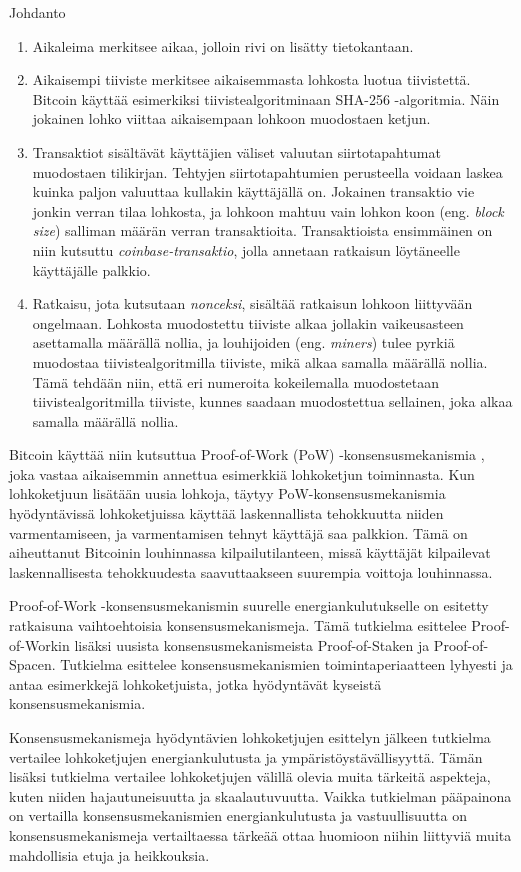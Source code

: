 \begin{chapter}{Johdanto\label{intro}}
\begin{otherlanguage}{finnish}
\begin{enumerate}
\item Aikaleima merkitsee aikaa, jolloin rivi on lisätty tietokantaan.
\item Aikaisempi tiiviste merkitsee aikaisemmasta lohkosta luotua tiivistettä. Bitcoin käyttää esimerkiksi tiivistealgoritminaan SHA-256 -algoritmia. Näin jokainen lohko viittaa aikaisempaan lohkoon muodostaen ketjun.
\item Transaktiot sisältävät käyttäjien väliset valuutan siirtotapahtumat muodostaen tilikirjan. Tehtyjen siirtotapahtumien perusteella voidaan laskea kuinka paljon valuuttaa kullakin käyttäjällä on. Jokainen transaktio vie jonkin verran tilaa lohkosta, ja lohkoon mahtuu vain lohkon koon (eng. \textit{block size}) salliman määrän verran transaktioita. Transaktioista ensimmäinen on niin kutsuttu \textit{coinbase-transaktio}, jolla annetaan ratkaisun löytäneelle käyttäjälle palkkio.
\item Ratkaisu, jota kutsutaan \textit{nonceksi}, sisältää ratkaisun lohkoon liittyvään ongelmaan. Lohkosta muodostettu tiiviste alkaa jollakin vaikeusasteen asettamalla määrällä nollia, ja louhijoiden (eng. \textit{miners}) tulee pyrkiä muodostaa tiivistealgoritmilla tiiviste, mikä alkaa samalla määrällä nollia. Tämä tehdään niin, että eri numeroita kokeilemalla muodostetaan tiivistealgoritmilla tiiviste, kunnes saadaan muodostettua sellainen, joka alkaa samalla määrällä nollia.
\end{enumerate}

Bitcoin käyttää niin kutsuttua Proof-of-Work (PoW) -konsensusmekanismia \cite{satoshibitcoin}, joka vastaa aikaisemmin annettua esimerkkiä lohkoketjun toiminnasta. Kun lohkoketjuun lisätään uusia lohkoja, täytyy PoW-konsensusmekanismia hyödyntävissä lohkoketjuissa käyttää laskennallista tehokkuutta niiden varmentamiseen, ja varmentamisen tehnyt käyttäjä saa palkkion. Tämä on aiheuttanut Bitcoinin louhinnassa kilpailutilanteen, missä käyttäjät kilpailevat laskennallisesta tehokkuudesta saavuttaakseen suurempia voittoja louhinnassa.

Proof-of-Work -konsensusmekanismin suurelle energiankulutukselle on esitetty ratkaisuna vaihtoehtoisia konsensusmekanismeja. Tämä tutkielma esittelee Proof-of-Workin lisäksi uusista konsensusmekanismeista Proof-of-Staken ja Proof-of-Spacen. Tutkielma esittelee konsensusmekanismien toimintaperiaatteen lyhyesti ja antaa esimerkkejä lohkoketjuista, jotka hyödyntävät kyseistä konsensusmekanismia.

Konsensusmekanismeja hyödyntävien lohkoketjujen esittelyn jälkeen tutkielma vertailee lohkoketjujen energiankulutusta ja ympäristöystävällisyyttä. Tämän lisäksi tutkielma vertailee lohkoketjujen välillä olevia muita tärkeitä aspekteja, kuten niiden hajautuneisuutta ja skaalautuvuutta. Vaikka tutkielman pääpainona on vertailla konsensusmekanismien energiankulutusta ja vastuullisuutta on konsensusmekanismeja vertailtaessa tärkeää ottaa huomioon niihin liittyviä muita mahdollisia etuja ja heikkouksia.

\end{otherlanguage}
\end{chapter}